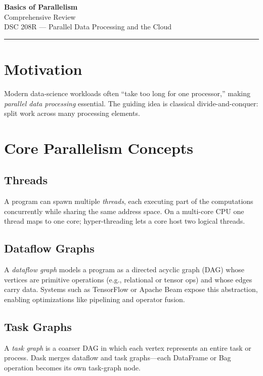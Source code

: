 \documentclass[11pt]{article}
\begin{document}
\begin{center}
  {\LARGE\bfseries Basics of Parallelism}\\[2mm]
  {\large Comprehensive Review}\\[1mm]
  {\normalsize DSC 208R — Parallel Data Processing and the Cloud}
\end{center}
\vspace{-0.6em}\hrule\vspace{0.9em}

\tableofcontents
\newpage

\section{Motivation}
Modern data-science workloads often “take too long for one processor,” making \emph{parallel data processing} essential.  
The guiding idea is classical divide-and-conquer: split work across many processing elements.

\section{Core Parallelism Concepts}

\subsection{Threads}
A program can spawn multiple \emph{threads}, each executing part of the computations concurrently while sharing the same address space.  
On a multi-core CPU one thread maps to one core; hyper-threading lets a core host two logical threads.

\subsection{Dataflow Graphs}
A \emph{dataflow graph} models a program as a directed acyclic graph (DAG) whose vertices are primitive operations (e.g., relational or tensor ops) and whose edges carry data.  
Systems such as TensorFlow or Apache Beam expose this abstraction, enabling optimizations like pipelining and operator fusion.

\subsection{Task Graphs}
A \emph{task graph} is a coarser DAG in which each vertex represents an entire task or process.  
Dask merges dataflow and task graphs—each DataFrame or Bag operation becomes its own task-graph node.
\end{document}
